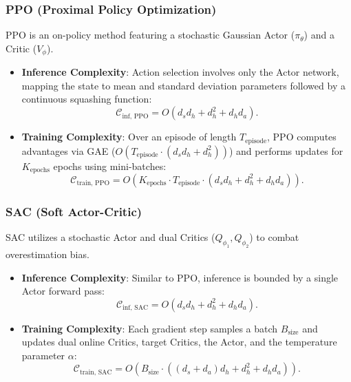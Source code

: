 \subsubsection{PPO (Proximal Policy Optimization)}
PPO is an on-policy method featuring a stochastic Gaussian Actor ($\pi_\theta$) and a Critic ($V_\phi$).
\begin{itemize}
    \item \textbf{Inference Complexity}: Action selection involves only the Actor network, mapping the state to mean and standard deviation parameters followed by a continuous squashing function:
    \begin{equation}
        \mathcal{C}_{\text{inf, PPO}} = O(d_s d_h + d_h^2 + d_h d_a).
    \end{equation}
    \item \textbf{Training Complexity}: Over an episode of length $T_{\text{episode}}$, PPO computes advantages via GAE ($O(T_{\text{episode}} \cdot (d_s d_h + d_h^2))$) and performs updates for $K_{\text{epochs}}$ epochs using mini-batches:
    \begin{equation}
        \mathcal{C}_{\text{train, PPO}} = O\left( K_{\text{epochs}} \cdot T_{\text{episode}} \cdot (d_s d_h + d_h^2 + d_h d_a) \right).
    \end{equation}
\end{itemize}

\subsubsection{SAC (Soft Actor-Critic)}
SAC utilizes a stochastic Actor and dual Critics ($Q_{\phi_1}, Q_{\phi_2}$) to combat overestimation bias.
\begin{itemize}
    \item \textbf{Inference Complexity}: Similar to PPO, inference is bounded by a single Actor forward pass:
    \begin{equation}
        \mathcal{C}_{\text{inf, SAC}} = O(d_s d_h + d_h^2 + d_h d_a).
    \end{equation}
    \item \textbf{Training Complexity}: Each gradient step samples a batch $B_{\text{size}}$ and updates dual online Critics, target Critics, the Actor, and the temperature parameter $\alpha$:
    \begin{equation}
        \mathcal{C}_{\text{train, SAC}} = O\left( B_{\text{size}} \cdot ((d_s + d_a) d_h + d_h^2 + d_h d_a) \right).
    \end{equation}
\end{itemize}

